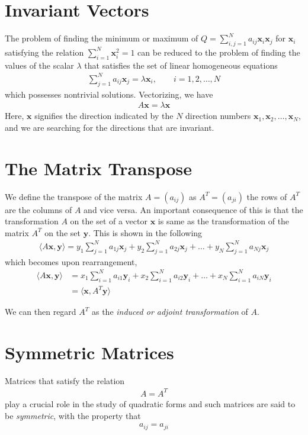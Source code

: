 \section{Invariant Vectors}
%
The problem of finding the minimum or maximum of  $Q = \sum_{i,j=1}^{N} a_{ij} \bm{x}_i \bm{x}_j$ for $\bm{x}_i$ satisfying the relation $\sum_{i=1}^{N} \bm{x}_i^2 = 1$ can be reduced to the problem of finding the values of the scalar $\lambda$ that satisfies the set of linear homogeneous equations
%
\begin{align}
	\sum_{j=1}^{N} a_{ij} \bm{x}_j = \lambda \bm{x}_i, \qquad i=1,2,\ldots, N
\end{align}
%
which possesses nontrivial solutions. Vectorizing, we have
%
\begin{align}
	A \bm{x} = \lambda \bm{x}
\end{align}
%
Here, $\bm{x}$ signifies the direction indicated by the $N$ direction numbers $\bm{x}_1, \bm{x}_2, \ldots, \bm{x}_N$, and we are searching for the directions  that are invariant.

\section{The Matrix Transpose}

We define the transpose of the matrix $A = (a_{ij})$ as $A^T = (a_{ji})$ \ie the rows of $A^T$ are the columns of $A$ and vice versa. An important consequence of this is that the transformation $A$ on the set of a vector $\bm{x}$ is same as the transformation of the matrix $A^T$ on the set $\bm{y}$. This is shown in the following
%
\begin{align}
	\langle A\bm{x}, \bm{y} \rangle  = y_1 \sum_{j=1}^{N} a_{1j} \bm{x}_j +  y_2 \sum_{j=1}^{N} a_{2j} \bm{x}_j +  \ldots +  y_N \sum_{j=1}^{N} a_{Nj} \bm{x}_j 
\end{align}
%
which becomes upon rearrangement,
%
\begin{align}
		\langle A\bm{x}, \bm{y} \rangle  & = x_1 \sum_{i=1}^{N} a_{i1} \bm{y}_i +  x_2 \sum_{i=1}^{N} a_{i2} \bm{y}_i +  \ldots +  x_N \sum_{i=1}^{N} a_{iN} \bm{y}_i  \\
		&= \langle \bm{x}, A^T \bm{y} \rangle 
\end{align}

We can then regard $A^T$ as the \textit{induced or adjoint transformation} of $A$.

\section{Symmetric Matrices}
Matrices that satisfy the relation 
\begin{align}
	A = A^T
\end{align}
%
play a crucial role in the study of quadratic forms and such matrices are said to be \textit{symmetric}, with the property that 
%
\begin{align}
	a_{ij} = a_{ji}
\end{align}

